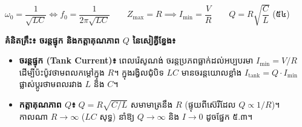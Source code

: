 \vspace{-0.4em}
\begin{center}
	$\boxed{\omega_0 = \dfrac{1}{\sqrt{LC}} \iff f_0 = \dfrac{1}{2\pi\sqrt{LC}}} \qquad \boxed{Z_{\max} = R \implies I_{\min} = \dfrac{V}{R}} \qquad \boxed{Q = R\sqrt{\dfrac{C}{L}}}$ \quad (៥៤)
\end{center}
\vspace{-0.8em}

\begin{center}
\begin{tcolorbox}[
	enhanced,
	colback=boxbg,
	colframe=bacpink!70,
	boxrule=0.8pt,
	sharp corners,
	borderline west={3pt}{0pt}{bacpink},
	width=0.92\linewidth,
	halign=left,
	left=12pt, right=10pt, top=5pt, bottom=5pt,
	fontupper=\small
]
	\raggedright
	\textbf{\textcolor{brownheader}{គំនិតគ្រឹះ៖ ចរន្តផ្ទុក និងកត្តាគុណភាព $Q$ នៃសៀគ្វីខ្នែង៖}}
	\par\vspace{2pt}
	\begin{itemize}[itemsep=1pt, topsep=1pt, parsep=0pt, leftmargin=1.2em]
		\item \textbf{ចរន្តផ្ទុក ({\englishfont Tank Current})៖} ពេលរ៉េសូណង់ ចរន្តប្រភពធ្លាក់ដល់អប្បបរមា $I_{\min} = V/R$ ដើម្បីប៉ះប៉ូវថាមពលកម្ដៅក្នុង $R$។ ក្នុងរង្វិលជុំបិទ $LC$ មានចរន្តយោលខ្លាំង $I_{\text{tank}} = Q \cdot I_{\min}$ ផ្លាស់ប្តូរថាមពលរវាង $L$ និង $C$។
		\item \textbf{កត្តាគុណភាព $Q$៖} $Q = R\sqrt{C/L}$ សមាមាត្រនឹង $R$ (ផ្ទុយពីស៊េរីដែល $Q \propto 1/R$)។ កាលណា $R \to \infty$ ($LC$ សុទ្ធ) នាំឱ្យ $Q \to \infty$ និង $I \to 0$ ដូចផ្នែក ៥.៣។
	\end{itemize}
\end{tcolorbox}
\end{center}

